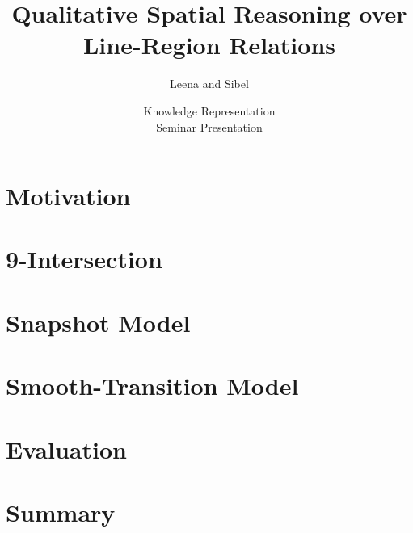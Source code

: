 \documentclass{beamer}
\begin{document}
	\title{Qualitative Spatial Reasoning over Line-Region Relations}
	\author{Leena and Sibel}
	\date{Knowledge Representation\\Seminar Presentation}
	
	\begin{frame}
		\titlepage
	\end{frame}
	
	\section{Motivation}
	
	
	\section{9-Intersection}	
	
	
	\section{Snapshot Model}	
	
	
	\section{Smooth-Transition Model}	
		
	
	\section{Evaluation}	
	
	
	\section{Summary}
	
	
\end{document}
